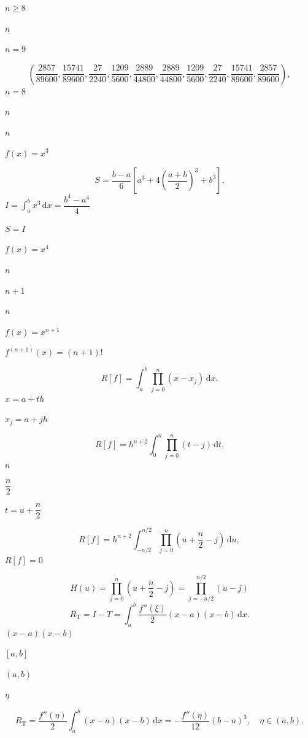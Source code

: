 \documentclass[UTF8,fontset=fandol]{ctexart}
\begin{document}
$n\geq8$\par
$n$\par
$n=9$\par
\[ 
\left(\frac{2857}{89600},\frac{15741}{89600},\frac{27}{2240},\frac{1209}{5600},\frac{2889}{44800},\frac{2889}{44800},\frac{1209}{5600},\frac{27}{2240},\frac{15741}{89600},\frac{2857}{89600}\right),
 \]
$n=8$\par
$n$\par
$n$\par
$f(x)=x^3$\par
\[ 
S=\frac{b-a}{6}\left[a^3+4\left(\frac{a+b}{2}\right)^3+b^3\right].
 \]
$I=\int_a^b x^3\,\mathrm{d}x=\dfrac{b^4-a^4}{4}$\par
$S=I$\par
$f(x)=x^4$\par
$n$\par
$n+1$\par
$n$\par
$f(x)=x^{n+1}$\par
$f^{(n+1)}(x)=(n+1)!$\par
\[ 
R[f]=\int_a^b\prod_{j=0}^n(x-x_j)\,\mathrm{d}x.
 \]
$x=a+th$\par
$x_j=a+jh$\par
\[ 
R[f]=h^{n+2}\int_0^n\prod_{j=0}^n(t-j)\,\mathrm{d}t.
 \]
$n$\par
$\dfrac n2$\par
$t=u+\dfrac n2$\par
\[ 
R[f]=h^{n+2}\int_{-n/2}^{n/2}\prod_{j=0}^n\left(u+\frac n2-j\right)\,\mathrm{d}u,
 \]
$R[f]=0$\par
\[ 
H(u)=\prod_{j=0}^n\left(u+\frac n2-j\right)=\prod_{j=-n/2}^{n/2}(u-j)
 \]
\[ 
R_{\mathrm{T}}=I-T=\int_a^b\frac{f''(\xi)}2(x-a)(x-b)\,\mathrm{d}x.
 \]
$(x-a)(x-b)$\par
$[a,b]$\par
$(a,b)$\par
$\eta$\par
\[ 
R_{\mathrm{T}}=\frac{f''(\eta)}2\int_a^b(x-a)(x-b)\,\mathrm{d}x
=-\frac{f''(\eta)}{12}(b-a)^3,\quad\eta\in(a,b).
\tag{4.2.5}
 \]
\end{document}
